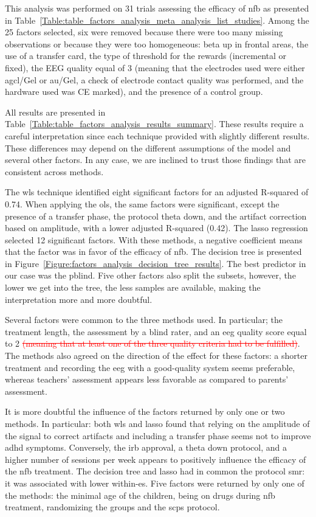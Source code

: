 This analysis was performed on 31 trials assessing the efficacy of \gls{nfb} as presented 
in Table~\ref{Table:table_factors_analysis_meta_analysis_list_studies}. Among the 25 factors selected, six were 
removed because there were too many missing observations or because they were too homogeneous: beta up in frontal areas, 
the use of a transfer card, the type of threshold for the rewards (incremental or fixed), the EEG quality equal of 3
(meaning that the electrodes used were either \gls{agcl}/Gel or \gls{au}/Gel, a check of electrode contact quality was
performed, and the hardware used was CE marked), and the presence of a control group. 

All results are presented in Table~\ref{Table:table_factors_analysis_results_summary}. These results require a 
careful interpretation since each technique provided with slightly different results. These differences 
may depend on the different assumptions of the model and several other factors. In any case, we are inclined to 
trust those findings that are consistent across methods. 

The \gls{wls} technique identified eight significant factors for an adjusted R-squared of 0.74. 
When applying the \gls{ols}, the same factors were significant, except the presence of 
a transfer phase, the protocol theta down, and the artifact correction based on amplitude, with a lower adjusted R-squared 
(0.42). The \gls{lasso} regression selected 12 significant factors. With these methods, a negative coefficient means 
that the factor was in favor  of the efficacy of \gls{nfb}. The decision tree is presented in Figure~\ref{Figure:factors_analysis_decision_tree_results}. 
The best predictor in our case was the \gls{pblind}. Five other factors also split the subsets, however, 
the lower we get into the tree, the less samples are available, making the interpretation more and more doubtful.  

Several factors were common to the three methods used. In particular; the treatment length, the assessment 
by a blind rater, and an \gls{eeg} quality score equal to 2 \textcolor{red}{\sout{(meaning that at least one of the three quality criteria had to be fulfilled)}}.
The methods also agreed on the direction of the effect for these factors: 
a shorter treatment and recording the \gls{eeg} with a good-quality system seems preferable, whereas teachers' assessment appears less favorable
as compared to parents' assessment.

It is more doubtful the influence of the factors returned by only one or two methods. In particular: 
both \gls{wls} and \gls{lasso} found that relying on the amplitude of the signal to correct artifacts and including a transfer 
phase seems not to improve \gls{adhd} symptoms. Conversely, the \gls{irb} approval, a theta down protocol, and a higher number 
of sessions per week appears to positively influence the efficacy of the \gls{nfb} treatment. The decision tree and \gls{lasso} had in common the protocol 
\gls{smr}: it was associated with lower within-\gls{es}. Five factors were returned by only one of the methods: the minimal age of the 
children, being on drugs during \gls{nfb} treatment, randomizing the groups and the \glspl{scp} protocol.  

